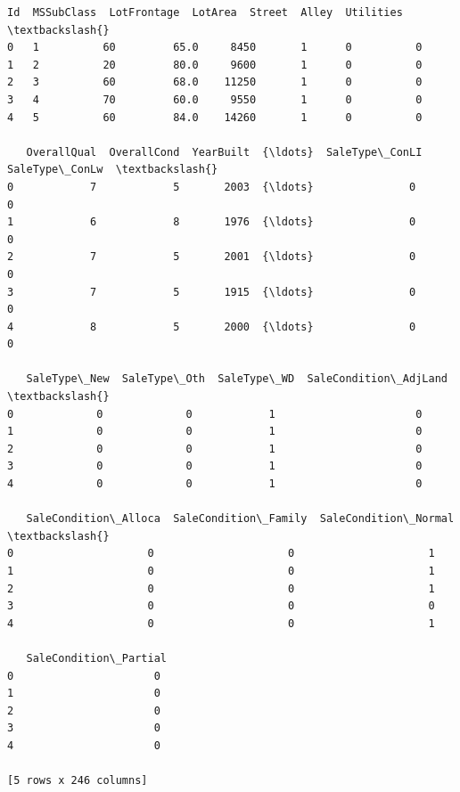 \documentclass[11pt]{article}
\makeatletter
\newcommand{\boxspacing}{\kern\kvtcb@left@rule\kern\kvtcb@boxsep}
\newcommand{\prompt}[4]{
        {\ttfamily\llap{{\color{#2}[#3]:\hspace{3pt}#4}}\vspace{-\baselineskip}}
    }
\makeatother
\begin{document}
            \begin{tcolorbox}[breakable, size=fbox, boxrule=.5pt, pad at break*=1mm, opacityfill=0]
\prompt{Out}{outcolor}{9}{\boxspacing}
\begin{Verbatim}[commandchars=\\\{\}]
   Id  MSSubClass  LotFrontage  LotArea  Street  Alley  Utilities  \textbackslash{}
0   1          60         65.0     8450       1      0          0
1   2          20         80.0     9600       1      0          0
2   3          60         68.0    11250       1      0          0
3   4          70         60.0     9550       1      0          0
4   5          60         84.0    14260       1      0          0

   OverallQual  OverallCond  YearBuilt  {\ldots}  SaleType\_ConLI  SaleType\_ConLw  \textbackslash{}
0            7            5       2003  {\ldots}               0               0
1            6            8       1976  {\ldots}               0               0
2            7            5       2001  {\ldots}               0               0
3            7            5       1915  {\ldots}               0               0
4            8            5       2000  {\ldots}               0               0

   SaleType\_New  SaleType\_Oth  SaleType\_WD  SaleCondition\_AdjLand  \textbackslash{}
0             0             0            1                      0
1             0             0            1                      0
2             0             0            1                      0
3             0             0            1                      0
4             0             0            1                      0

   SaleCondition\_Alloca  SaleCondition\_Family  SaleCondition\_Normal  \textbackslash{}
0                     0                     0                     1
1                     0                     0                     1
2                     0                     0                     1
3                     0                     0                     0
4                     0                     0                     1

   SaleCondition\_Partial
0                      0
1                      0
2                      0
3                      0
4                      0

[5 rows x 246 columns]
\end{Verbatim}
\end{tcolorbox}
        
\end{document}
